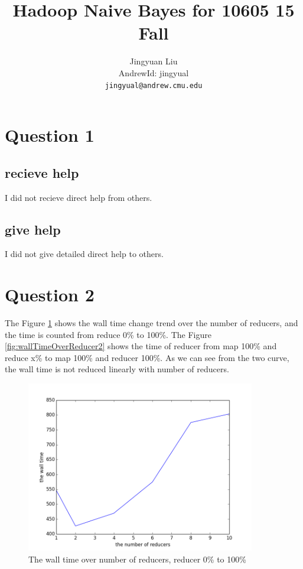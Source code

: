 \documentclass{article} %
\title{Hadoop Naive Bayes for 10605 15 Fall}
\author{
Jingyuan Liu\\
AndrewId: jingyual\\
\texttt{jingyual@andrew.cmu.edu} \\
}
\begin{document}
\maketitle


\section{Question 1}


\subsection{recieve help}
I did not recieve direct help from others.

\subsection{give help}
I did not give detailed direct help to others.


\section{Question 2}
The Figure \ref{fig:wallTimeOverReducer1} shows the wall time change trend over
the number of reducers, and the time is counted from reduce 0\% to 100\%. The
Figure \ref{fig:wallTimeOverReducer2} shows the time of reducer from map 100\%
and reduce x\% to map 100\% and reducer 100\%. As we can see from the two curve,
the wall time is not reduced linearly with number of reducers.

\begin{figure}[h]
\begin{center}
\includegraphics[width=10cm]{pic/figure_1.png}
\end{center}
\caption{The wall time over number of reducers, reducer 0\% to 100\%}
\label{fig:wallTimeOverReducer1}
\end{figure}
\end{document}
